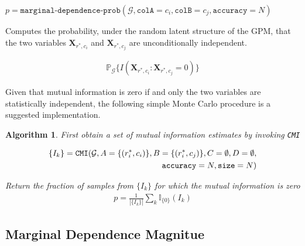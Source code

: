 \documentclass[10pt,letterpaper]{article}
\newtheorem{algorithm}{Algorithm}[section]
\newcommand{\set}[1]{\{#1\}}
\newcommand{\G}{\mathcal{G}}
\begin{document}
 $p = \texttt{marginal-dependence-prob}(\G,
    \texttt{colA}=c_i,
    \texttt{colB}=c_j,
    \texttt{accuracy}=N)$


    Computes the probability, under the random latent structure of the GPM,
    that the two variables $\mathbf{X}_{r^*,c_i}$ and $\mathbf{X}_{r^*,c_j}$ are
    unconditionally independent.

    \begin{align*}
    \mathbb{P}_\G\set{I(\mathbf{X}_{r^*,c_i} : \mathbf{X}_{r^*,c_j} = 0)}
    \end{align*}

    Given that mutual information is zero if and only the two variables are
    statistically independent, the following simple Monte Carlo procedure is a
    suggested implementation.

    \begin{algorithm} \label{alg:marginal_depprob} First obtain a set of mutual
        information estimates by invoking {\tt CMI}

        \begin{align*}
        \set{I_k} = {\tt CMI}(
        \G,
        A = \set{(r_i^*,c_i)}, B = \set{(r_i^*,c_j)}, C = \emptyset, D =
        \emptyset,\\ {\tt accuracy} = N, {\tt size} = N)
        \end{align*}

        Return the fraction of samples from $\set{I_k}$ for which the mutual
        information is zero
        \begin{align*}
            p = \frac{1}{|\set{I_k}|}\sum_{k}{\mathbb{I}_{\set{0}}(I_k)}
        \end{align*}
    \end{algorithm}

\subsection{Marginal Dependence Magnitue}

\end{document}

